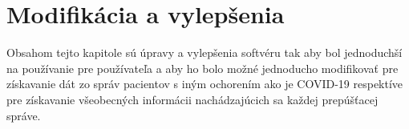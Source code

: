\chapter{Modifikácia a vylepšenia}

Obsahom tejto kapitole sú úpravy a vylepšenia softvéru tak aby bol jednoduchší na používanie pre používateľa a aby ho bolo možné jednoducho modifikovať pre získavanie dát zo správ pacientov s iným ochorením ako je COVID-19 respektíve pre získavanie všeobecných informácii nachádzajúcich sa každej prepúšťacej správe.  